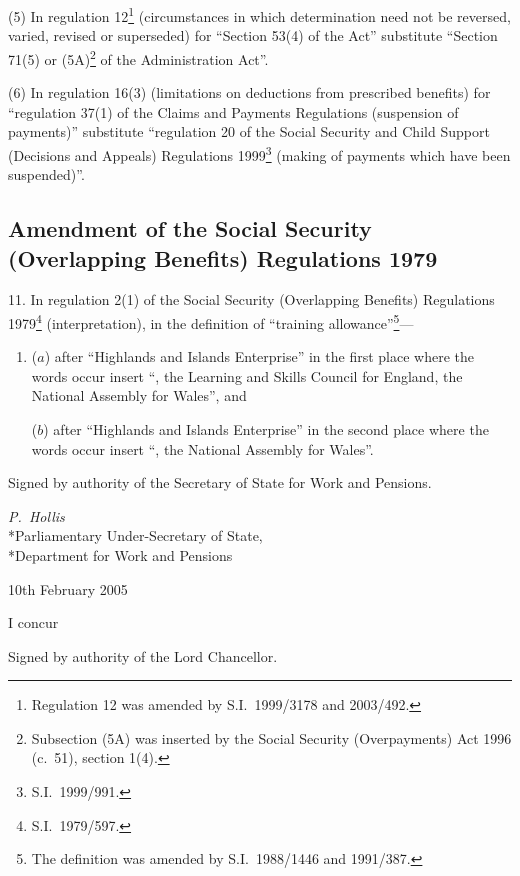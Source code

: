 \documentclass[12pt,a4paper]{article}
\begin{document}
(5) In regulation 12\footnote{Regulation 12 was amended by S.I.\ 1999/3178 and 2003/492.} (circumstances in which determination need not be reversed, varied, revised or superseded) for “Section 53(4) of the Act” substitute “Section 71(5) or (5A)\footnote{Subsection (5A) was inserted by the Social Security (Overpayments) Act 1996 (c.\ 51), section 1(4).} of the Administration Act”.

(6) In regulation 16(3) (limitations on deductions from prescribed benefits) for “regulation 37(1) of the Claims and Payments Regulations (suspension of payments)” substitute “regulation 20 of the Social Security and Child Support (Decisions and Appeals) Regulations 1999\footnote{S.I.\ 1999/991.} (making of payments which have been suspended)”.

\subsection[11. Amendment of the Social Security (Overlapping Benefits) Regulations 1979]{Amendment of the Social Security (Overlapping Benefits) Regulations 1979}

11.  In regulation 2(1) of the Social Security (Overlapping Benefits) Regulations 1979\footnote{S.I.\ 1979/597.} (interpretation), in the definition of “training allowance”\footnote{The definition was amended by S.I.\ 1988/1446 and 1991/387.}—
\begin{enumerate}\item[]
($a$) after “Highlands and Islands Enterprise” in the first place where the words occur insert “, the Learning and Skills Council for England, the National Assembly for Wales”, and

($b$) after “Highlands and Islands Enterprise” in the second place where the words occur insert “, the National Assembly for Wales”.
\end{enumerate}

\bigskip

Signed 
by authority of the 
Secretary of State for Work and Pensions.

{\raggedleft
\emph{P.~Hollis}\\*Parliamentary Under-Secretary of State,\\*Department for Work and Pensions

}

10th February 2005

\bigskip

I concur

Signed 
by authority of the 
Lord Chancellor.
\end{document}
